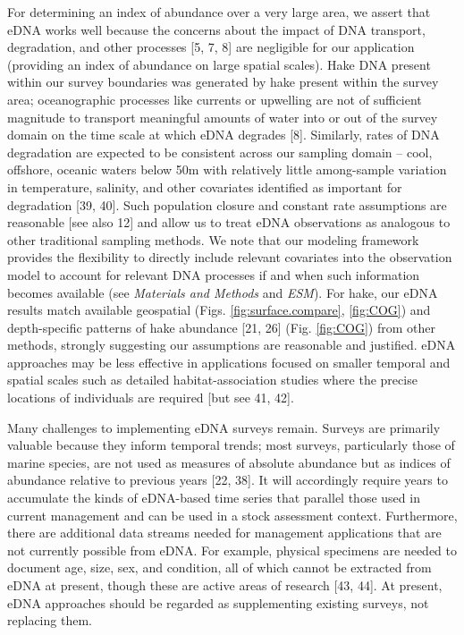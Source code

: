 \documentclass[
]{article}
\begin{document}
For determining an index of abundance over a very large area, we assert
that eDNA works well because the concerns about the impact of DNA
transport, degradation, and other processes {[}5, 7, 8{]} are negligible for
our application (providing an index of abundance on large spatial
scales). Hake DNA present within our survey boundaries was generated by
hake present within the survey area; oceanographic processes like
currents or upwelling are not of sufficient magnitude to transport
meaningful amounts of water into or out of the survey domain on the time
scale at which eDNA degrades {[}8{]}. Similarly, rates of DNA degradation
are expected to be consistent across our sampling domain -- cool,
offshore, oceanic waters below 50m with relatively little among-sample
variation in temperature, salinity, and other covariates identified as
important for degradation {[}39, 40{]}. Such population closure and constant
rate assumptions are reasonable {[}see also 12{]} and allow us to treat
eDNA observations as analogous to other traditional sampling methods. We
note that our modeling framework provides the flexibility to directly
include relevant covariates into the observation model to account for
relevant DNA processes if and when such information becomes available
(see \emph{Materials and Methods} and \emph{ESM}). For hake, our eDNA
results match available geospatial (Figs. \ref{fig:surface.compare},
\ref{fig:COG}) and depth-specific patterns of hake abundance {[}21, 26{]} (Fig. \ref{fig:COG}) 
from other methods, strongly suggesting our
assumptions are reasonable and justified. eDNA approaches may be less
effective in applications focused on smaller temporal and spatial scales
such as detailed habitat-association studies where the precise locations
of individuals are required {[}but see 41, 42{]}.

Many challenges to implementing eDNA surveys remain. Surveys are
primarily valuable because they inform temporal trends; most surveys,
particularly those of marine species, are not used as measures of
absolute abundance but as indices of abundance relative to previous
years {[}22, 38{]}. It will accordingly require years to accumulate the
kinds of eDNA-based time series that parallel those used in current 
management and can be used in a stock assessment context.
Furthermore, there are additional data streams needed for management
applications that are not currently possible from eDNA. For example,
physical specimens are needed to document age, size, sex, and condition,
all of which cannot be extracted from eDNA at present, though these are
active areas of research {[}43, 44{]}. At present, eDNA approaches should be
regarded as supplementing existing surveys, not replacing them.
\end{document}
